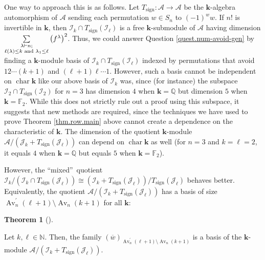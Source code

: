 \documentclass[numbers=enddot,12pt,final,onecolumn,notitlepage]{scrartcl}%
\numberwithin{exer}{subsection}
\theoremstyle{definition}
\newtheorem{theo}{Theorem}[subsection]
\newenvironment{theorem}[1][]
{\begin{theo}[#1]\begin{leftbar}}
{\end{leftbar}\end{theo}}
\let\sumnonlimits\sum
\renewcommand{\sum}{\sumnonlimits\limits}
\begin{document}
One way to approach this is as follows. Let $T_{\operatorname*{sign}%
}:\mathcal{A}\rightarrow\mathcal{A}$ be the $\mathbf{k}$-algebra automorphism
of $\mathcal{A}$ sending each permutation $w\in S_{n}$ to $\left(  -1\right)
^{w}w$. If $n!$ is invertible in $\mathbf{k}$, then $\mathcal{I}_{k}\cap
T_{\operatorname*{sign}}\left(  \mathcal{I}_{\ell}\right)  $ is a free
$\mathbf{k}$-submodule of $\mathcal{A}$ having dimension $\sum
\limits_{\substack{\lambda\vdash n;\\\ell\left(  \lambda\right)  \leq k\text{
and }\lambda_{1}\leq\ell}}\left(  f^{\lambda}\right)  ^{2}$. Thus, we could
answer Question \ref{quest.num-avoid-gen} by finding a $\mathbf{k}$-module
basis of $\mathcal{I}_{k}\cap T_{\operatorname*{sign}}\left(  \mathcal{I}%
_{\ell}\right)  $ indexed by permutations that avoid $12\cdots\left(
k+1\right)  $ and $\left(  \ell+1\right)  \ell\cdots1$. However, such a basis
cannot be independent on $\operatorname*{char}\mathbf{k}$ like our above basis
of $\mathcal{I}_{k}$ was, since (for instance) the subspace $\mathcal{I}%
_{2}\cap T_{\operatorname*{sign}}\left(  \mathcal{I}_{2}\right)  $ for $n=3$
has dimension $4$ when $\mathbf{k}=\mathbb{Q}$ but dimension $5$ when
$\mathbf{k}=\mathbb{F}_{2}$. While this does not strictly rule out a proof
using this subspace, it suggests that new methods are required, since the
techniques we have used to prove Theorem \ref{thm.row.main} above cannot
create a dependence on the characteristic of $\mathbf{k}$. The dimension of
the quotient $\mathbf{k}$-module $\mathcal{A}/\left(  \mathcal{J}%
_{k}+T_{\operatorname*{sign}}\left(  \mathcal{J}_{\ell}\right)  \right)  $ can
depend on $\operatorname*{char}\mathbf{k}$ as well (for $n=3$ and $k=\ell=2$,
it equals $4$ when $\mathbf{k}=\mathbb{Q}$ but equals $5$ when $\mathbf{k}%
=\mathbb{F}_{2}$).

However, the \textquotedblleft mixed\textquotedblright\ quotient
$\mathcal{I}_{k}/\left(  \mathcal{I}_{k}\cap T_{\operatorname*{sign}}\left(
\mathcal{J}_{\ell}\right)  \right)  \cong\left(  \mathcal{I}_{k}%
+T_{\operatorname*{sign}}\left(  \mathcal{J}_{\ell}\right)  \right)
/T_{\operatorname*{sign}}\left(  \mathcal{J}_{\ell}\right)  $ behaves better.
Equivalently, the quotient $\mathcal{A}/\left(  \mathcal{I}_{k}%
+T_{\operatorname*{sign}}\left(  \mathcal{J}_{\ell}\right)  \right)  $ has a
basis of size $\operatorname*{Av}\nolimits_{n}^{\prime}\left(  \ell+1\right)
\setminus\operatorname*{Av}\nolimits_{n}\left(  k+1\right)  $ for all
$\mathbf{k}$:

\begin{theorem}
\label{thm.A/I+J}Let $k,\ell\in\mathbb{N}$. Then, the family $\left(
\overline{w}\right)  _{\operatorname*{Av}\nolimits_{n}^{\prime}\left(
\ell+1\right)  \setminus\operatorname*{Av}\nolimits_{n}\left(  k+1\right)  }$
is a basis of the $\mathbf{k}$-module $\mathcal{A}/\left(  \mathcal{I}%
_{k}+T_{\operatorname*{sign}}\left(  \mathcal{J}_{\ell}\right)  \right)  $.
\end{theorem}
\end{document}
